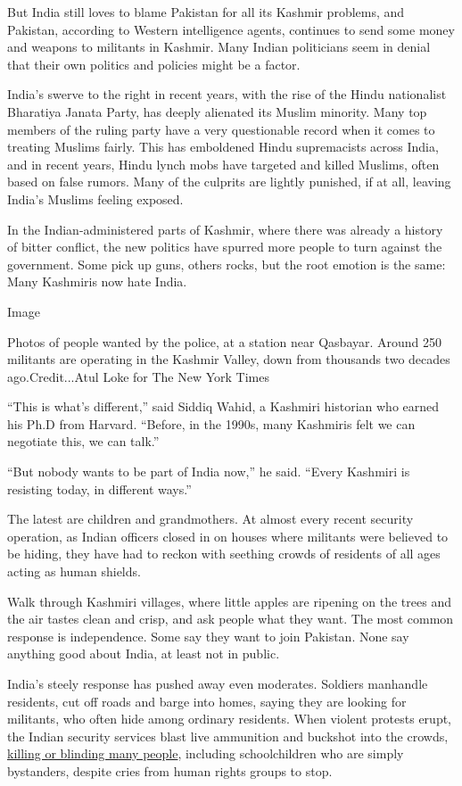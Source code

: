 But India still loves to blame Pakistan for all its Kashmir problems,
and Pakistan, according to Western intelligence agents, continues to
send some money and weapons to militants in Kashmir. Many Indian
politicians seem in denial that their own politics and policies might be
a factor.

India's swerve to the right in recent years, with the rise of the Hindu
nationalist Bharatiya Janata Party, has deeply alienated its Muslim
minority. Many top members of the ruling party have a very questionable
record when it comes to treating Muslims fairly. This has emboldened
Hindu supremacists across India, and in recent years, Hindu lynch mobs
have targeted and killed Muslims, often based on false rumors. Many of
the culprits are lightly punished, if at all, leaving India's Muslims
feeling exposed.

In the Indian-administered parts of Kashmir, where there was already a
history of bitter conflict, the new politics have spurred more people to
turn against the government. Some pick up guns, others rocks, but the
root emotion is the same: Many Kashmiris now hate India.

Image

Photos of people wanted by the police, at a station near Qasbayar.
Around 250 militants are operating in the Kashmir Valley, down from
thousands two decades ago.Credit...Atul Loke for The New York Times

``This is what's different,'' said Siddiq Wahid, a Kashmiri historian
who earned his Ph.D from Harvard. ``Before, in the 1990s, many Kashmiris
felt we can negotiate this, we can talk.''

``But nobody wants to be part of India now,'' he said. ``Every Kashmiri
is resisting today, in different ways.''

The latest are children and grandmothers. At almost every recent
security operation, as Indian officers closed in on houses where
militants were believed to be hiding, they have had to reckon with
seething crowds of residents of all ages acting as human shields.

Walk through Kashmiri villages, where little apples are ripening on the
trees and the air tastes clean and crisp, and ask people what they want.
The most common response is independence. Some say they want to join
Pakistan. None say anything good about India, at least not in public.

India's steely response has pushed away even moderates. Soldiers
manhandle residents, cut off roads and barge into homes, saying they are
looking for militants, who often hide among ordinary residents. When
violent protests erupt, the Indian security services blast live
ammunition and buckshot into the crowds,
\href{https://www.nytimes.com/2016/08/29/world/asia/pellet-guns-used-in-kashmir-protests-cause-dead-eyes-epidemic.html}{killing
or blinding many people}, including schoolchildren who are simply
bystanders, despite cries from human rights groups to stop.

